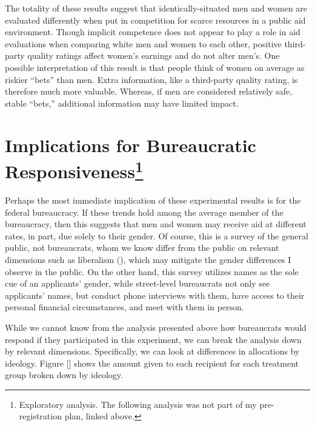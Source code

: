 \documentclass[12pt]{article}%
\begin{document}
\begin{doublespace}

The totality of these results suggest that identically-situated men and women are evaluated differently when put in competition for scarce resources in a public aid environment. Though implicit competence does not appear to play a role in aid evaluations when comparing white men and women to each other, positive third-party quality ratings affect women’s earnings and do not alter men’s. One possible interpretation of this result is that people think of women on average as riskier “bets” than men. Extra information, like a third-party quality rating, is therefore much more valuable. Whereas, if men are considered relatively safe, stable “bets,” additional information may have limited impact.

\section*{Implications for Bureaucratic Responsiveness\footnote{Exploratory analysis. The following analysis was not part of my pre-registration plan, linked above.}}
Perhaps the most immediate implication of these experimental results is for the federal bureaucracy. If these trends hold among the average member of the bureaucracy, then this suggests that men and women may receive aid at different rates, in part, due solely to their gender. Of course, this is a survey of the general public, not bureaucrats, whom we know differ from the public on relevant dimensions such as liberalism (), which may mitigate the gender differences I observe in the public. On the other hand, this survey utilizes names as the sole cue of an applicants’ gender, while street-level bureaucrats not only see applicants’ names, but conduct phone interviews with them, have access to their personal financial circumstances, and meet with them in person.


While we cannot know from the analysis presented above how bureaucrats would respond if they participated in this experiment, we can break the analysis down by relevant dimensions. Specifically, we can look at differences in allocations by ideology. Figure [] shows the amount given to each recipient for each treatment group broken down by ideology.



\end{doublespace}
\end{document}
